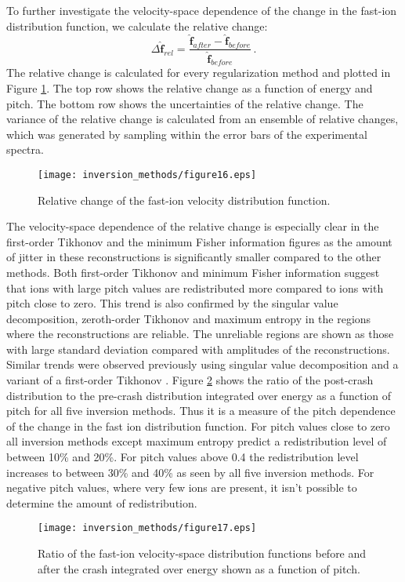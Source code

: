 To further investigate the velocity-space dependence of the change in the fast-ion distribution function, we calculate the relative change:
\begin{equation}
\Delta \mathbf{\hat{f}}_{rel} = \frac{\mathbf{\hat{f}}_{after} - \mathbf{\hat{f}}_{before}}{\mathbf{\hat{f}}_{before}}  \, .
\end{equation}
The relative change is calculated for every regularization method and plotted in Figure \ref{fig:tomos_sawtooth_rel}. 
The top row shows the relative change as a function of energy and pitch. The bottom row shows the uncertainties of the relative change.
The variance of the relative change is calculated from an ensemble of relative changes, which was generated by sampling within the error bars of the experimental spectra.
\begin{figure}[h!]
    \centering
    \texttt{[image: inversion\_methods/figure16.eps]}
    \caption{Relative change of the fast-ion velocity distribution function.} \label{fig:tomos_sawtooth_rel}
\end{figure}
The velocity-space dependence of the relative change is especially clear in the first-order Tikhonov and the minimum Fisher information figures as the amount of jitter in these reconstructions is significantly smaller compared to the other methods. 
Both first-order Tikhonov and minimum Fisher information suggest that ions with large pitch values are redistributed more compared to ions with pitch close to zero. 
This trend is also confirmed by the singular value decomposition, zeroth-order Tikhonov and maximum entropy in the regions where the reconstructions are reliable.
The unreliable regions are shown as those with large standard deviation compared with amplitudes of the reconstructions. 
Similar trends were observed previously using singular value decomposition \cite{Geiger2015} and a variant of a first-order Tikhonov \cite{Weiland2015}.
Figure \ref{fig:tomos_sawtooth_rel_1D} shows the ratio of the post-crash distribution to the pre-crash distribution integrated over energy as a function of pitch for all five inversion methods. Thus it is a measure of the pitch dependence of the change in the fast ion distribution function. 
For pitch values close to zero all inversion methods except maximum entropy predict a redistribution level of between 10\% and 20\%.
For pitch values above 0.4 the redistribution level increases to between 30\% and 40\% as seen by all five inversion methods. For negative pitch values, where very few ions are present, it isn't possible to determine the amount of redistribution.
\begin{figure}[h!]
    \centering
    \texttt{[image: inversion\_methods/figure17.eps]}
    \caption{Ratio of the fast-ion velocity-space distribution functions before and after the crash integrated over energy shown as a function of pitch.} \label{fig:tomos_sawtooth_rel_1D}
\end{figure}

